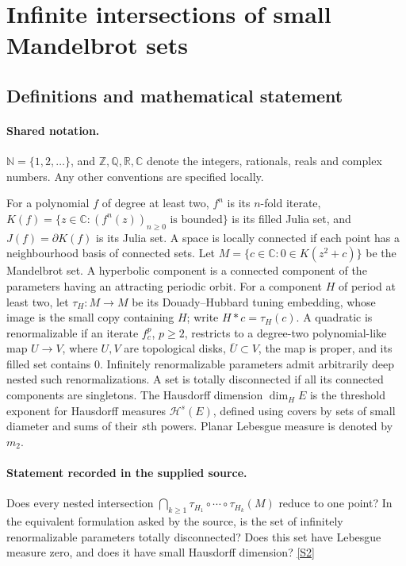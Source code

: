 \documentclass[11pt]{article}
\newcommand{\sref}[2]{\hyperlink{source:#1:#2}{[S#2]}}
\begin{document}
\section{Infinite intersections of small Mandelbrot sets}\label{statement}

\subsection{Definitions and mathematical statement}

\paragraph{Shared notation.}$\mathbb N=\{1,2,\ldots\}$, and $\mathbb Z,\mathbb Q,\mathbb R,\mathbb C$ denote the integers, rationals, reals and complex numbers. Any other conventions are specified locally.


For a polynomial $f$ of degree at least two, $f^n$ is its $n$-fold iterate, $K(f)=\{z\in\mathbb C:(f^n(z))_{n\geq0}\text{ is bounded}\}$ is its filled Julia set, and $J(f)=\partial K(f)$ is its Julia set. A space is locally connected if each point has a neighbourhood basis of connected sets. Let $M=\{c\in\mathbb C:0\in K(z^2+c)\}$ be the Mandelbrot set. A hyperbolic component is a connected component of the parameters having an attracting periodic orbit. For a component $H$ of period at least two, let $\tau_H:M\to M$ be its Douady--Hubbard tuning embedding, whose image is the small copy containing $H$; write $H*c=\tau_H(c)$. A quadratic is renormalizable if an iterate $f_c^p$, $p\geq2$, restricts to a degree-two polynomial-like map $U\to V$, where $U,V$ are topological disks, $\overline U\subset V$, the map is proper, and its filled set contains $0$. Infinitely renormalizable parameters admit arbitrarily deep nested such renormalizations. A set is totally disconnected if all its connected components are singletons. The Hausdorff dimension $\dim_H E$ is the threshold exponent for Hausdorff measures $\mathcal H^s(E)$, defined using covers by sets of small diameter and sums of their $s$th powers. Planar Lebesgue measure is denoted by $m_2$.
\paragraph{Statement recorded in the supplied source.}
Does every nested intersection $\bigcap_{k\geq1}\tau_{H_1}\circ\cdots\circ\tau_{H_k}(M)$ reduce to one point? In the equivalent formulation asked by the source, is the set of infinitely renormalizable parameters totally disconnected? Does this set have Lebesgue measure zero, and does it have small Hausdorff dimension? \sref{statement}{2}
\end{document}
